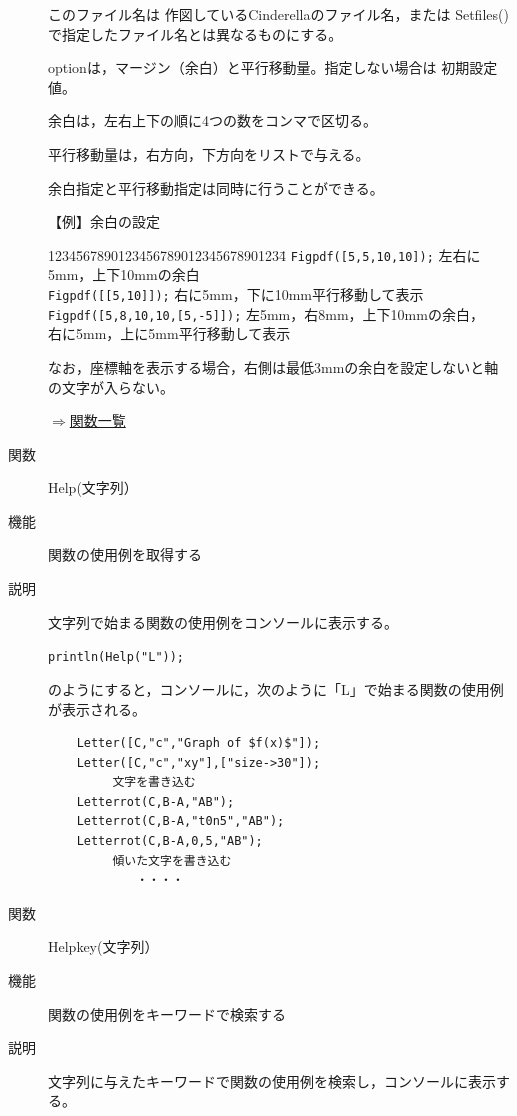\documentclass[papersize,a4paper,12pt,uplatex]{jsarticle}
\begin{document}
\begin{description}
このファイル名は 作図しているCinderellaのファイル名，または Setfiles() で指定したファイル名とは異なるものにする。

optionは，マージン（余白）と平行移動量。指定しない場合は 初期設定値。

余白は，左右上下の順に4つの数をコンマで区切る。

平行移動量は，右方向，下方向をリストで与える。

余白指定と平行移動指定は同時に行うことができる。

\vspace{\baselineskip}
【例】余白の設定
\begin{tabbing}
1234\=567890123456789012345678901234\=\kill
 \> \verb|Figpdf([5,5,10,10]);|      \> 左右に5mm，上下10mmの余白\\
 \> \verb|Figpdf([[5,10]]);|      \>  右に5mm，下に10mm平行移動して表示\\
 \> \verb|Figpdf([5,8,10,10,[5,-5]]);|     \> 左5mm，右8mm，上下10mmの余白，\\
  \>                                        \> 右に5mm，上に5mm平行移動して表示
\end{tabbing}
                                      
なお，座標軸を表示する場合，右側は最低3mmの余白を設定しないと軸の文字が入らない。

\begin{flushright}  \hyperlink{functionlist}{$\Rightarrow$関数一覧}\end{flushright}

\vspace{\baselineskip}
\hypertarget{help}{}
\item[関数]  Help(文字列）
\item[機能]  関数の使用例を取得する
\item[説明]  文字列で始まる関数の使用例をコンソールに表示する。

\hspace{10mm} \verb|println(Help("L"));|
    
  のようにすると，コンソールに，次のように「L」で始まる関数の使用例が表示される。
\begin{verbatim}
    Letter([C,"c","Graph of $f(x)$"]); 
    Letter([C,"c","xy"],["size->30"]); 
         文字を書き込む 
    Letterrot(C,B-A,"AB"); 
    Letterrot(C,B-A,"t0n5","AB"); 
    Letterrot(C,B-A,0,5,"AB"); 
         傾いた文字を書き込む 
         　　・・・・
\end{verbatim}

\vspace{\baselineskip}
\hypertarget{helpkey}{}
\item[関数]  Helpkey(文字列）
\item[機能]  関数の使用例をキーワードで検索する
\item[説明]  文字列に与えたキーワードで関数の使用例を検索し，コンソールに表示する。


\end{description}
\end{document}
